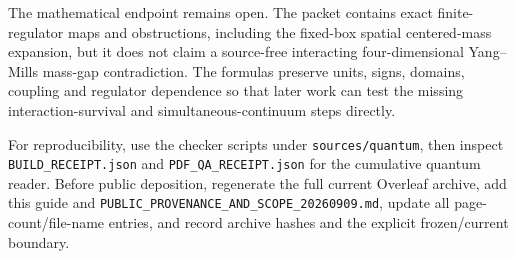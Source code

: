 The mathematical endpoint remains open. The packet contains exact
finite-regulator maps and obstructions, including the fixed-box spatial
centered-mass expansion, but it does not claim a source-free interacting
four-dimensional Yang--Mills mass-gap contradiction. The formulas
preserve units, signs, domains, coupling and regulator dependence so
that later work can test the missing interaction-survival and
simultaneous-continuum steps directly.

For reproducibility, use the checker scripts under
\texttt{sources/quantum}, then inspect \texttt{BUILD\_RECEIPT.json} and
\texttt{PDF\_QA\_RECEIPT.json} for the cumulative quantum reader. Before
public deposition, regenerate the full current Overleaf archive, add
this guide and \texttt{PUBLIC\_PROVENANCE\_AND\_SCOPE\_20260909.md},
update all page-count/file-name entries, and record archive hashes and
the explicit frozen/current boundary.

